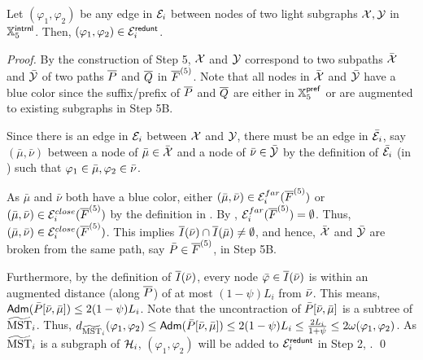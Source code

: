 \begin{lemma}\label{lm:Item4-Nonde}Let $(\varphi_1,\varphi_2)$ be any edge in $\mathcal{E}_i$ between nodes of two light subgraphs $\mathcal{X} ,\mathcal{Y}$ in $\mathbb{X}_5^{\mathsf{intrnl}}$. Then,  $(\varphi_1,\varphi_2) \in \mathcal{E}_i^{\mathsf{redunt}}$.
\end{lemma}
\begin{proof} By the construction of Step 5, $\mathcal{X}$ and $\mathcal{Y}$ correspond to two subpaths $\bar{{\mathcal{X}}}$ and $\bar{\mathcal{Y}}$ of two paths $\overline{P}$ and $\overline{Q}$ in $\overline{F}^{(5)}$. Note that all nodes in $\bar{{\mathcal{X}}}$ and $\bar{\mathcal{Y}}$  have a blue color since the suffix/prefix of  $\overline{P}$ and $\overline{Q}$ are either in  $\mathbb{X}_5^{\mathsf{pref}}$ or are augmented to existing subgraphs in Step 5B.  
	
	
	Since there is an edge in $\mathcal{E}_i$ between $\mathcal{X}$ and $\mathcal{Y}$, there must be an edge in $\bar{\mathcal{E}}_i$, say $(\bar{\mu},\bar{\nu})$ between a node of $\bar{\mu} \in \bar{{\mathcal{X}}}$ and a node of $\bar{\nu} \in \bar{\mathcal{Y}}$ by the definition of $\bar{\mathcal{E}}_i$ (in ) such that $\varphi_1 \in \bar\mu, \varphi_2 \in \bar\nu$.
	
	As $\bar{\mu}$ and $\bar{\nu}$ both have a blue color, either $(\bar{\mu},\bar{\nu}) \in \mathcal{E}_i^{far}(\overline{F}^{(5)})$ or $(\bar{\mu},\bar{\nu}) \in \mathcal{E}_i^{close}(\overline{F}^{(5)})$ by the definition in . By , $\mathcal{E}_i^{far}(\overline{F}^{(5)}) = \emptyset$. Thus,  $(\bar{\mu},\bar{\nu}) \in \mathcal{E}_i^{close}(\overline{F}^{(5)})$. This implies $\overline{I}(\bar\nu)\cap \overline{I}(\bar\mu)\not= \emptyset$, and hence, $\bar{{\mathcal{X}}}$ and $\bar{\mathcal{Y}}$ are broken from the same path, say $\bar{P} \in \overline{F}^{(5)}$, in Step 5B.  
	
	Furthermore,  by the definition of $\overline{I}(\bar\nu)$, every node $\bar{\varphi} \in \overline{I}(\bar\nu)$ is within an augmented distance (along $\overline{P}$) of at most $(1-\psi)L_i$ from $\bar\nu$. This means, $\mathsf{Adm}(\bar{P}[\bar\nu,\bar\mu]) \leq 2(1-\psi)L_i$. Note that the uncontraction of $\bar{P}[\bar\nu,\bar\mu]$ is a subtree of $\widetilde{\mathrm{MST}}_{i}$. Thus, $d_{\widetilde{\mathrm{MST}}_{i}}(\varphi_1,\varphi_2) \leq \mathsf{Adm}(\bar{P}[\bar\nu,\bar\mu]) \leq 2(1-\psi)L_i \leq \frac{2L_i}{1+\psi} \leq 2 \omega(\varphi_1,\varphi_2)$. As $\widetilde{\mathrm{MST}}_{i}$ is a subgraph of $\mathcal{H}_i$, $(\varphi_1,\varphi_2)$ will be added to $\mathcal{E}_i^{\mathsf{redunt}}$ in Step 2, .	\qed
\end{proof}


